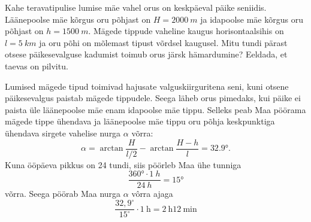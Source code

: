 
Kahe teravatipulise lumise mäe vahel orus on keskpäeval päike seniidis. Läänepoolse mäe kõrgus oru põhjast on $H=\SI{2000}{m}$ ja idapoolse mäe kõrgus oru põhjast on $h=\SI{1500}{m}$. Mägede tippude vaheline kaugus horisontaalsihis on $l=\SI{5}{km}$ ja oru põhi on mõlemast tipust võrdsel kaugusel. Mitu tundi pärast otsese päikesevalguse kadumist toimub orus järsk hämardumine? Eeldada, et taevas on pilvitu.

\hint

\solu
Lumised mägede tipud toimivad hajusate valguskiirguritena seni, kuni otsene päikesevalgus paistab mägede tippudele. Seega läheb orus pimedaks, kui päike ei paista üle läänepoolse mäe enam idapoolse mäe tippu. Selleks peab Maa pöörama mägede tippe ühendava ja läänepoolse mäe tippu oru põhja keskpunktiga ühendava sirgete vahelise nurga $\alpha$ võrra:
$$
\alpha=\arctan \frac{H}{l / 2}-\arctan \frac{H-h}{l}=\ang{32,9}.
$$
Kuna ööpäeva pikkus on 24 tundi, siis pöörleb Maa ühe tunniga
$$
\frac{\ang{360} \cdot \SI{1}{h}}{\SI{24}{h}}=\ang{15}
$$
võrra. Seega pöörab Maa nurga $\alpha$ vôrra ajaga
$$
\frac{32,9^{\circ}}{15^{\circ}} \cdot 1 \mathrm{~h}=2 \mathrm{~h} 12 \mathrm{~min}
$$
\probend